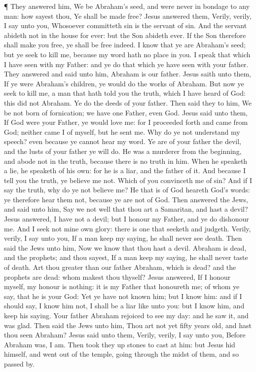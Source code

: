  ¶ They answered him, We be Abraham's seed, and were never
in bondage to any man: how sayest thou, Ye shall be made free?
 Jesus answered them, Verily, verily, I say unto you,
Whosoever committeth sin is the servant of sin.  And the
servant abideth not in the house for ever: but the Son abideth ever.
 If the Son therefore shall make you free, ye shall be free
indeed.  I know that ye are Abraham's seed; but ye seek to
kill me, because my word hath no place in you.  I speak
that which I have seen with my Father: and ye do that which ye have seen
with your father.  They answered and said unto him, Abraham
is our father. Jesus saith unto them, If ye were Abraham's children, ye
would do the works of Abraham.  But now ye seek to kill me,
a man that hath told you the truth, which I have heard of God: this did
not Abraham.  Ye do the deeds of your father. Then said
they to him, We be not born of fornication; we have one Father, even
God.  Jesus said unto them, If God were your Father, ye
would love me: for I proceeded forth and came from God; neither came I
of myself, but he sent me.  Why do ye not understand my
speech? even because ye cannot hear my word.  Ye are of
your father the devil, and the lusts of your father ye will do. He was a
murderer from the beginning, and abode not in the truth, because there
is no truth in him. When he speaketh a lie, he speaketh of his own: for
he is a liar, and the father of it.  And because I tell you
the truth, ye believe me not.  Which of you convinceth me
of sin? And if I say the truth, why do ye not believe me? 
He that is of God heareth God's words: ye therefore hear them not,
because ye are not of God.  Then answered the Jews, and
said unto him, Say we not well that thou art a Samaritan, and hast a
devil?  Jesus answered, I have not a devil; but I honour my
Father, and ye do dishonour me.  And I seek not mine own
glory: there is one that seeketh and judgeth.  Verily,
verily, I say unto you, If a man keep my saying, he shall never see
death.  Then said the Jews unto him, Now we know that thou
hast a devil. Abraham is dead, and the prophets; and thou sayest, If a
man keep my saying, he shall never taste of death.  Art
thou greater than our father Abraham, which is dead? and the prophets
are dead: whom makest thou thyself?  Jesus answered, If I
honour myself, my honour is nothing: it is my Father that honoureth me;
of whom ye say, that he is your God:  Yet ye have not known
him; but I know him: and if I should say, I know him not, I shall be a
liar like unto you: but I know him, and keep his saying. 
Your father Abraham rejoiced to see my day: and he saw it, and was glad.
 Then said the Jews unto him, Thou art not yet fifty years
old, and hast thou seen Abraham?  Jesus said unto them,
Verily, verily, I say unto you, Before Abraham was, I am. 
Then took they up stones to cast at him: but Jesus hid himself, and went
out of the temple, going through the midst of them, and so passed by.

